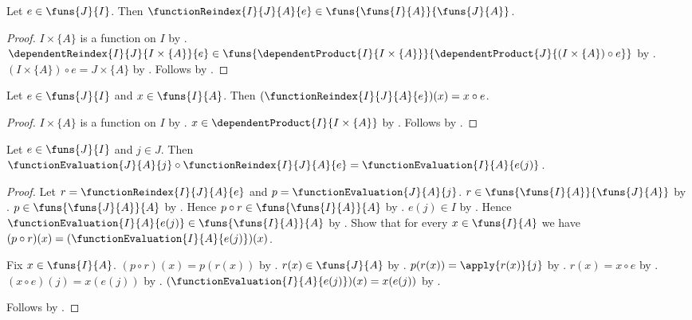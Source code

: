 \begin{proposition}\label{function_reindex_type}
    Let $e\in\funs{J}{I}$.
    Then $\functionReindex{I}{J}{A}{e}\in\funs{\funs{I}{A}}{\funs{J}{A}}$.
\end{proposition}
\begin{proof}
    $I\times\{A\}$ is a function on $I$ by
        .
    $\dependentReindex{I}{J}{I\times\{A\}}{e}\in
        \funs{\dependentProduct{I}{I\times\{A\}}}{
            \dependentProduct{J}{(I\times\{A\})\circ e}}$ by
        .
    $(I\times\{A\})\circ e=J\times\{A\}$ by
        .
    Follows by .
\end{proof}

\begin{proposition}\label{function_reindex_apply}
    Let $e\in\funs{J}{I}$ and $x\in\funs{I}{A}$.
    Then $(\functionReindex{I}{J}{A}{e})(x)=x\circ e$.
\end{proposition}
\begin{proof}
    $I\times\{A\}$ is a function on $I$ by
        .
    $x\in\dependentProduct{I}{I\times\{A\}}$ by
        .
    Follows by .
\end{proof}

\begin{theorem}\label{function_reindex_coordinate}
    Let $e\in\funs{J}{I}$ and $j\in J$.
    Then $\functionEvaluation{J}{A}{j}\circ\functionReindex{I}{J}{A}{e}
        =\functionEvaluation{I}{A}{e(j)}$.
\end{theorem}
\begin{proof}
    Let $r=\functionReindex{I}{J}{A}{e}$ and $p=\functionEvaluation{J}{A}{j}$.
    $r\in\funs{\funs{I}{A}}{\funs{J}{A}}$ by .
    $p\in\funs{\funs{J}{A}}{A}$ by .
    Hence $p\circ r\in\funs{\funs{I}{A}}{A}$ by .
    $e(j)\in I$ by .
    Hence $\functionEvaluation{I}{A}{e(j)}\in\funs{\funs{I}{A}}{A}$ by
        .
    Show that for every $x\in\funs{I}{A}$ we have
        $(p\circ r)(x)=(\functionEvaluation{I}{A}{e(j)})(x)$.
    \begin{subproof}
        Fix $x\in\funs{I}{A}$.
        $(p\circ r)(x)=p(r(x))$ by
            .
        $r(x)\in\funs{J}{A}$ by .
        $p(r(x))=\apply{r(x)}{j}$ by .
        $r(x)=x\circ e$ by .
        $(x\circ e)(j)=x(e(j))$ by
            .
        $(\functionEvaluation{I}{A}{e(j)})(x)=x(e(j))$ by
            .
    \end{subproof}
    Follows by .
\end{proof}

